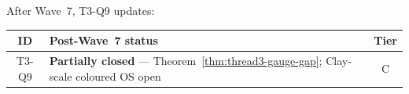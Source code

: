 \begin{remark}
\label{rmk:thread3-wave7-table}
After Wave~7, T3-Q9 updates:
\begin{center}
\small
\begin{tabular}{@{}clc@{}}
\toprule
\textbf{ID} & \textbf{Post-Wave~7 status} & \textbf{Tier} \\
\midrule
T3-Q9 &
  \textbf{Partially closed} --- Theorem~\ref{thm:thread3-gauge-gap};
  Clay-scale coloured OS open &
  C \\
\bottomrule
\end{tabular}
\end{center}
\end{remark}
